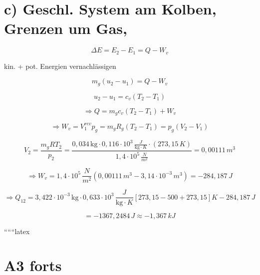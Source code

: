 \section*{c) Geschl. System am Kolben, Grenzen um Gas,}

\[
\Delta E = E_2 - E_1 = Q - W_v
\]

\noindent
kin. + pot. Energien vernachlässigen

\[
m_g (u_2 - u_1) = Q - W_v
\]

\[
u_2 - u_1 = c_v (T_2 - T_1)
\]

\[
\Rightarrow Q = m_g c_v (T_2 - T_1) + W_v
\]

\[
\Rightarrow W_v = V_1^{rev} p_g = m_g R_g (T_2 - T_1) = p_g (V_2 - V_1)
\]

\[
V_2 = \frac{m_g R T_2}{p_2} = \frac{0,034 \, \text{kg} \cdot 0,116 \cdot 10^3 \, \frac{J}{\text{kg} \cdot K} \cdot (273,15 \, K)}{1,4 \cdot 10^5 \, \frac{N}{m^2}} = 0,00111 \, m^3
\]

\[
\Rightarrow W_v = 1,4 \cdot 10^5 \, \frac{N}{m^2} (0,00111 \, m^3 - 3,14 \cdot 10^{-3} \, m^3) = -284,187 \, J
\]

\[
\Rightarrow Q_{12} = 3,422 \cdot 10^{-3} \, \text{kg} \cdot 0,633 \cdot 10^3 \, \frac{J}{\text{kg} \cdot K} \left[ 273,15 - 500 + 273,15 \right] K - 284,187 \, J
\]

\[
= -1 367,2484 \, J \approx -1,367 \, kJ
\]

``````latex


\section*{A3 forts}